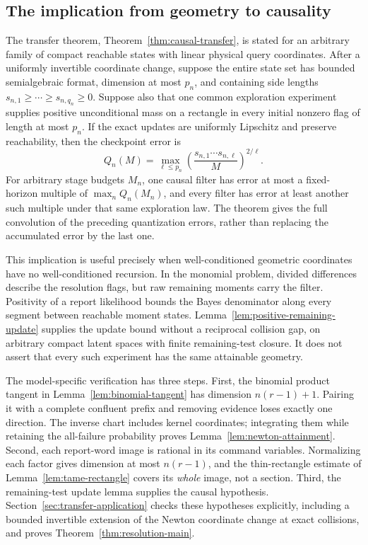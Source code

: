 \documentclass[11pt]{amsart}
\theoremstyle{definition}\newtheorem{definition}[theorem]{Definition}
\theoremstyle{remark}\newtheorem{remark}[theorem]{Remark}
\begin{document}
\subsection{The implication from geometry to causality}
The transfer theorem, Theorem~\ref{thm:causal-transfer}, is stated for
an arbitrary family of compact reachable states with linear physical
query coordinates. After a uniformly invertible coordinate change,
suppose the entire state set has bounded semialgebraic format,
dimension at most $p_n$, and containing side lengths
$s_{n,1}\ge\cdots\ge s_{n,q_n}\ge0$. Suppose also that one common
exploration experiment supplies positive unconditional mass on a
rectangle in every initial nonzero flag of length at most $p_n$.
If the exact updates are uniformly Lipschitz and preserve reachability,
then the checkpoint error is
\[
 Q_n(M)=\max_{\ell\le p_n}
       \left(\frac{s_{n,1}\cdots s_{n,\ell}}{M}\right)^{2/\ell}.
\]
For arbitrary stage budgets $M_n$, one causal filter has error at most
a fixed-horizon multiple of $\max_n Q_n(M_n)$, and every filter has
error at least another such multiple under that same exploration law.
The theorem gives the full convolution of the preceding quantization
errors, rather than replacing the accumulated error by the last one.

This implication is useful precisely when well-conditioned geometric
coordinates have no well-conditioned recursion. In the monomial
problem, divided differences describe the resolution flags, but raw
remaining moments carry the filter. Positivity of a report likelihood
bounds the Bayes denominator along every segment between reachable
moment states. Lemma~\ref{lem:positive-remaining-update} supplies the
update bound without a reciprocal collision gap, on arbitrary compact
latent spaces with finite remaining-test closure. It does not assert
that every such experiment has the same attainable geometry.

The model-specific verification has three steps. First, the binomial
product tangent in Lemma~\ref{lem:binomial-tangent} has dimension
$n(r-1)+1$. Pairing it with a complete confluent prefix and removing
evidence loses exactly one direction. The inverse chart includes
kernel coordinates; integrating them while retaining the all-failure
probability proves Lemma~\ref{lem:newton-attainment}. Second, each
report-word image is rational in its command variables. Normalizing
each factor gives dimension at most $n(r-1)$, and the
thin-rectangle estimate of Lemma~\ref{lem:tame-rectangle} covers its
\emph{whole} image, not a section. Third, the remaining-test update
lemma supplies the causal hypothesis. Section~\ref{sec:transfer-application}
checks these hypotheses explicitly, including a bounded invertible
extension of the Newton coordinate change at exact collisions, and
proves Theorem~\ref{thm:resolution-main}.
\end{document}

